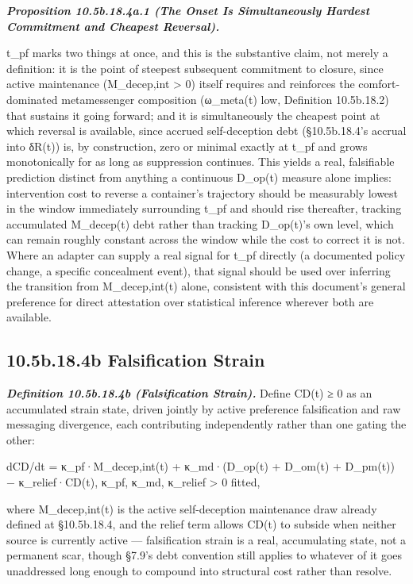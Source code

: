 \documentclass[
]{article}
\begin{document}
\emph{\textbf{Proposition 10.5b.18.4a.1 (The Onset Is Simultaneously
Hardest Commitment and Cheapest Reversal).}}

t\_pf marks two things at once, and this is the substantive claim, not
merely a definition: it is the point of steepest subsequent commitment
to closure, since active maintenance (M\_decep,int \textgreater{} 0)
itself requires and reinforces the comfort-dominated metamessenger
composition (ω\_meta(t) low, Definition 10.5b.18.2) that sustains it
going forward; and it is simultaneously the cheapest point at which
reversal is available, since accrued self-deception debt (§10.5b.18.4's
accrual into δR(t)) is, by construction, zero or minimal exactly at
t\_pf and grows monotonically for as long as suppression continues. This
yields a real, falsifiable prediction distinct from anything a
continuous D\_op(t) measure alone implies: intervention cost to reverse
a container's trajectory should be measurably lowest in the window
immediately surrounding t\_pf and should rise thereafter, tracking
accumulated M\_decep(t) debt rather than tracking D\_op(t)'s own level,
which can remain roughly constant across the window while the cost to
correct it is not. Where an adapter can supply a real signal for t\_pf
directly (a documented policy change, a specific concealment event),
that signal should be used over inferring the transition from
M\_decep,int(t) alone, consistent with this document's general
preference for direct attestation over statistical inference wherever
both are available.

\hypertarget{b.18.4b-falsification-strain}{%
\subsection{10.5b.18.4b Falsification
Strain}\label{b.18.4b-falsification-strain}}

\emph{\textbf{Definition 10.5b.18.4b (Falsification Strain).}} Define
CD(t) ≥ 0 as an accumulated strain state, driven jointly by active
preference falsification and raw messaging divergence, each contributing
independently rather than one gating the other:

dCD/dt = κ\_pf·M\_decep,int(t) + κ\_md·(D\_op(t) + D\_om(t) + D\_pm(t))
− κ\_relief·CD(t), κ\_pf, κ\_md, κ\_relief \textgreater{} 0 fitted,

where M\_decep,int(t) is the active self-deception maintenance draw
already defined at §10.5b.18.4, and the relief term allows CD(t) to
subside when neither source is currently active --- falsification strain
is a real, accumulating state, not a permanent scar, though §7.9's debt
convention still applies to whatever of it goes unaddressed long enough
to compound into structural cost rather than resolve.
\end{document}
